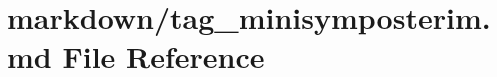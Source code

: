 \hypertarget{tag__minisymposterim_8md}{}\section{markdown/tag\+\_\+minisymposterim.md File Reference}
\label{tag__minisymposterim_8md}
